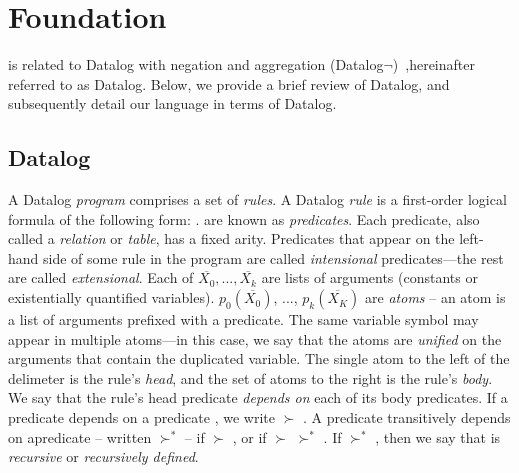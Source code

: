 \section{Foundation}
\label{sec:lang}

\lang is related to Datalog with negation and aggregation
(Datalog$\lnot$)~\cite{ullmanbook},hereinafter referred to as Datalog.
Below, we provide a brief review of Datalog, and subsequently detail our
language in terms of Datalog.%

\subsection{Datalog}
\label{sec:datalog}

A Datalog {\em program} comprises a set of {\em rules}.  A Datalog {\em rule}
is a first-order logical formula of the following form:
.   are known as {\em
predicates}.  Each predicate, also called a {\em relation} or {\em table}, has
a fixed arity.  Predicates that appear on the left-hand side of some rule in
the program are called {\em intensional} predicates---the rest are called {\em
extensional}.  Each of $\overline{X_0}, ..., \overline{X_k}$ are lists of
arguments (constants or existentially quantified variables).
$p_0(\overline{X_0})$, ..., $p_k(\overline{X_K})$ are {\em atoms} -- an atom is
a list of arguments prefixed with a predicate.  The same variable symbol may
appear in multiple atoms---in this case, we say that the atoms are {\em
unified} on the arguments that contain the duplicated variable.  The single
atom to the left of the \dedalus{:-} delimeter is the rule's {\em head}, and
the set of atoms to the right is the rule's {\em body}.  We say that the rule's
head predicate {\em depends on} each of its body predicates.  If a predicate
 depends on a predicate , we write  $\succ$
.  A predicate  transitively depends on apredicate
 -- written  $\succ^*$  -- if 
$\succ$ , or if  $\succ$  $\succ^*$
.  If  $\succ^*$ , then we say that 
is {\em recursive} or {\em recursively defined}.

